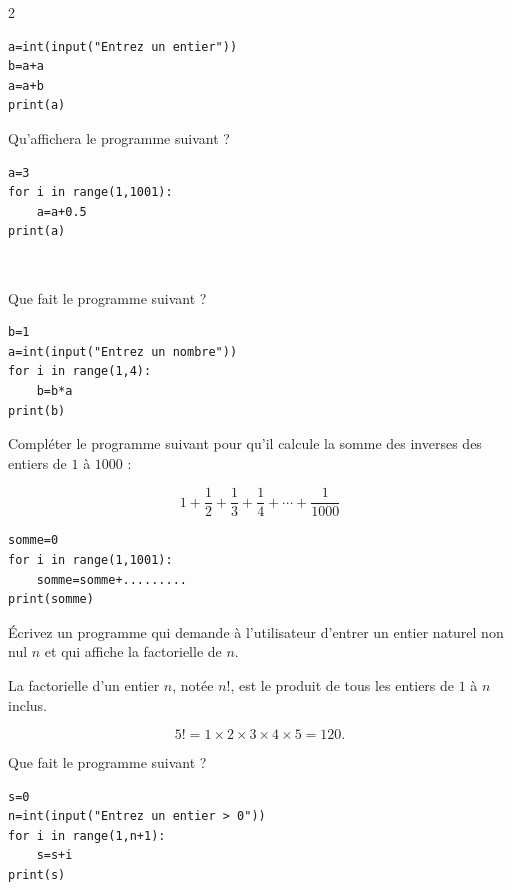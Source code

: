 {\begin{multicols}{2}
\begin{exo}{}
		  \begin{lstlisting}
a=int(input("Entrez un entier"))
b=a+a
a=a+b
print(a)
\end{lstlisting}
	  \end{exo}

	  \begin{exo}{}
		  Qu'affichera le programme suivant ?

		  \begin{lstlisting}
a=3
for i in range(1,1001):
    a=a+0.5
print(a)
\end{lstlisting}
	  \end{exo}

	  \vfill~\columnbreak

	  \begin{exo}{}
		  Que fait le programme suivant ?

		  \begin{lstlisting}
b=1
a=int(input("Entrez un nombre"))
for i in range(1,4):
    b=b*a
print(b)
\end{lstlisting}
	  \end{exo}

	  \begin{exo}{}
		  Compléter le programme suivant pour qu'il calcule la somme des inverses des entiers de $1$ à $1000$ :

		  \[
			  1 + \frac12 + \frac13 + \frac14 + \cdots + \frac1{1000}
		  \]

		  \begin{lstlisting}
somme=0
for i in range(1,1001):
    somme=somme+.........
print(somme)
\end{lstlisting}
	  \end{exo}

	  \begin{exo}{}
		  Écrivez un programme qui demande à l'utilisateur d'entrer un entier naturel non nul $n$ et qui affiche la factorielle de $n$.

		  La factorielle d'un entier $n$, notée $n!$, est le produit de tous les entiers de $1$ à $n$ inclus.

		  \[
			  5! = 1 \times 2 \times 3 \times 4 \times 5 = 120.
		  \]
	  \end{exo}

	  \begin{exo}{}
		  Que fait le programme suivant ?
		  {\footnotesize
		  \begin{lstlisting}
s=0
n=int(input("Entrez un entier > 0"))
for i in range(1,n+1):
    s=s+i
print(s)
\end{lstlisting}
		  }
	  \end{exo}


\end{multicols}}
